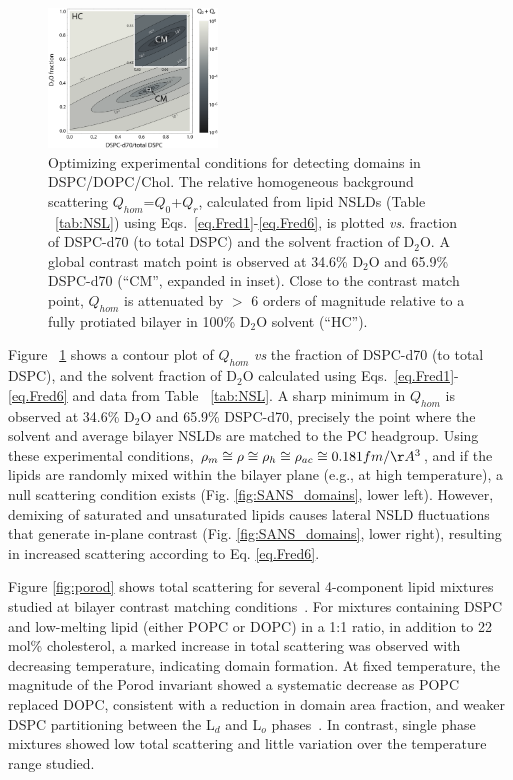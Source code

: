 \documentclass[8.5pt,twoside,twocolumn]{article}
\begin{document}
\begin{figure} [t]
	\centering
	\includegraphics[width=0.4\textwidth]{figures/figure_2_contrast_match_contour.eps}
	\caption{Optimizing experimental conditions for detecting domains in DSPC/DOPC/Chol. The relative homogeneous background scattering $Q_{hom}$=$Q_0$+$Q_r$, calculated from lipid NSLDs (Table ~\ref{tab:NSL}) using Eqs.~\ref{eq.Fred1}-\ref{eq.Fred6}, is plotted \emph{vs}. fraction of DSPC-d70 (to total DSPC) and the solvent fraction of D$_2$O. A global contrast match point is observed at 34.6\% D$_2$O and 65.9\% DSPC-d70 (``CM'', expanded in inset). Close to the contrast match point, $Q_{hom}$ is attenuated by $>$ 6 orders of magnitude relative to a fully protiated bilayer in 100\% D$_2$O solvent (``HC'').}
	\label{fig:opt_exp_cond}
	
\end{figure}

 Figure ~\ref{fig:opt_exp_cond} shows a contour plot of $Q_{hom}$ \emph{vs} the fraction of DSPC-d70 (to total DSPC), and the solvent fraction of D$_2$O calculated using Eqs.~\ref{eq.Fred1}-\ref{eq.Fred6} and data from Table ~\ref{tab:NSL}. A sharp minimum in $Q_{hom}$ is observed at 34.6\% D$_2$O and 65.9\% DSPC-d70, precisely the point where the solvent and average bilayer NSLDs are matched to the PC headgroup. Using these experimental conditions, $\rho_m \cong \rho \cong \rho_h \cong \rho_{ac} \cong 0.181 fm/\AA^3$, and if the lipids are randomly mixed within the bilayer plane (e.g., at high temperature), a null scattering condition exists (Fig. \ref{fig:SANS_domains}, lower left). However, demixing of saturated and unsaturated lipids causes lateral NSLD fluctuations that generate in-plane contrast (Fig. \ref{fig:SANS_domains}, lower right), resulting in increased scattering according to Eq. \ref{eq.Fred6}.

Figure \ref{fig:porod} shows total scattering for several 4-component lipid mixtures studied at bilayer contrast matching conditions~\cite{Heberle.2013}. For mixtures containing DSPC and low-melting lipid (either POPC or DOPC) in a 1:1 ratio, in addition to 22 mol\% cholesterol, a marked increase in total scattering was observed with decreasing temperature, indicating domain formation. At fixed temperature, the magnitude of the Porod invariant showed a systematic decrease as POPC replaced DOPC, consistent with a reduction in domain area fraction, and weaker DSPC partitioning between the L$_d$ and L$_o$ phases~\cite{Heberle.2010,Konyakhina.2013}. In contrast, single phase mixtures showed low total scattering and little variation over the temperature range studied.
\end{document}
